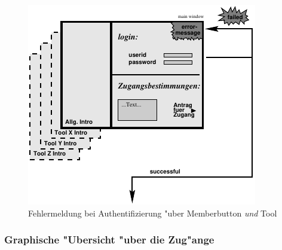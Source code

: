 \begin{figure}[h]
\begin{center}
\ifx\pdfoutput\undefined
\else
  \includegraphics{Skizzen/authent_page_error.pdf}
\fi
\caption{Fehlermeldung bei Authentifizierung "uber Memberbutton \textit{und} Tool}
\end{center}
\end{figure}

\clearpage

\subsubsection{Graphische "Ubersicht "uber die Zug"ange}

